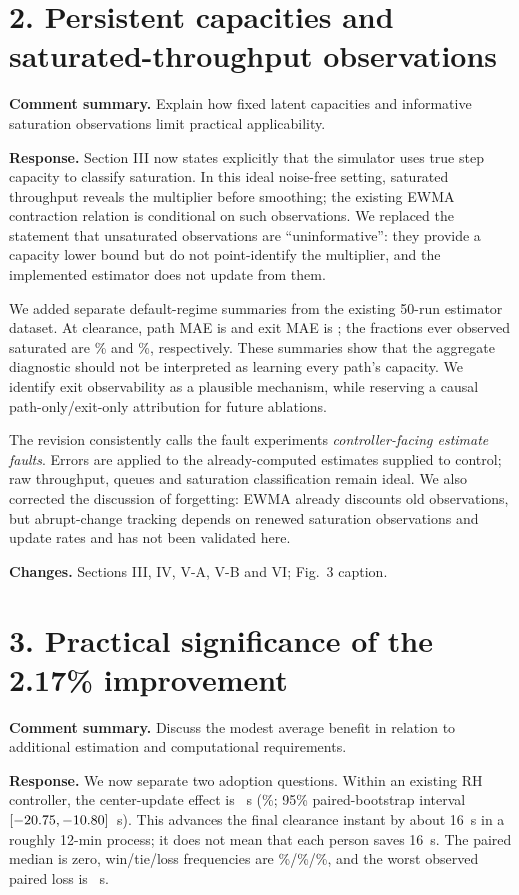 \documentclass[11pt]{article}
\begin{document}
\section*{2. Persistent capacities and saturated-throughput observations}
\textbf{Comment summary.} Explain how fixed latent capacities and informative saturation observations limit practical applicability.

\textbf{Response.} Section III now states explicitly that the simulator uses true step capacity to classify saturation. In this ideal noise-free setting, saturated throughput reveals the multiplier before smoothing; the existing EWMA contraction relation is conditional on such observations. We replaced the statement that unsaturated observations are ``uninformative'': they provide a capacity lower bound but do not point-identify the multiplier, and the implemented estimator does not update from them.

We added separate default-regime summaries from the existing 50-run estimator dataset. At clearance, path MAE is \PathFinalMAE{} and exit MAE is \ExitFinalMAE{}; the fractions ever observed saturated are \PathObservedPct\% and \ExitObservedPct\%, respectively. These summaries show that the aggregate diagnostic should not be interpreted as learning every path's capacity. We identify exit observability as a plausible mechanism, while reserving a causal path-only/exit-only attribution for future ablations.

The revision consistently calls the fault experiments \emph{controller-facing estimate faults}. Errors are applied to the already-computed estimates supplied to control; raw throughput, queues and saturation classification remain ideal. We also corrected the discussion of forgetting: EWMA already discounts old observations, but abrupt-change tracking depends on renewed saturation observations and update rates and has not been validated here.

\textbf{Changes.} Sections III, IV, V-A, V-B and VI; Fig.~3 caption.

\section*{3. Practical significance of the 2.17\% improvement}
\textbf{Comment summary.} Discuss the modest average benefit in relation to additional estimation and computational requirements.

\textbf{Response.} We now separate two adoption questions. Within an existing RH controller, the center-update effect is \PrimaryDiff~s (\PrimaryPct\%; 95\% paired-bootstrap interval $[-20.75,-10.80]$~s). This advances the final clearance instant by about 16~s in a roughly 12-min process; it does not mean that each person saves 16~s. The paired median is zero, win/tie/loss frequencies are \PrimaryWin\%/\PrimaryTie\%/\PrimaryLoss\%, and the worst observed paired loss is \WorstHarm~s.
\end{document}

